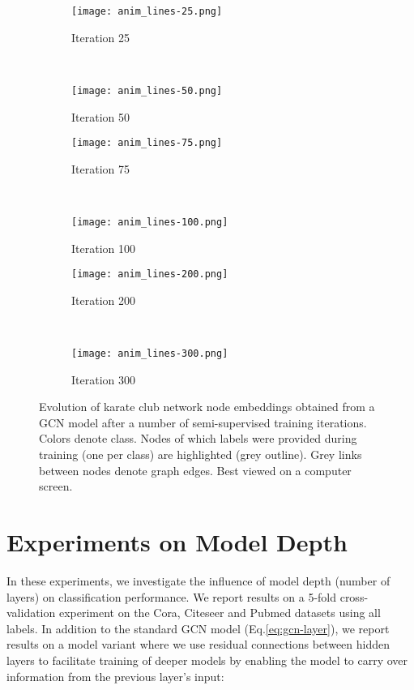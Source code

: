 \documentclass{article} \usepackage{iclr2017_conference,times}
\makeatletter
\newcommand*{\eq}{Eq.\@\xspace}
\makeatother
\begin{document}
\begin{figure}[htbp]
\centering
\begin{subfigure}[b]{0.5\textwidth}
    \centering
    \texttt{[image: anim\_lines-25.png]}
    \caption{Iteration 25}
    \label{fig:semi-emb-a}
\end{subfigure}~
\begin{subfigure}[b]{0.5\textwidth}
    \centering
    \texttt{[image: anim\_lines-50.png]}
    \caption{Iteration 50}
    \label{fig:semi-emb-b}
\end{subfigure}\vspace{0.5em}
\begin{subfigure}[b]{0.5\textwidth}
    \centering
    \texttt{[image: anim\_lines-75.png]}
    \caption{Iteration 75}
    \label{fig:semi-emb-c}
\end{subfigure}~
\begin{subfigure}[b]{0.5\textwidth}
    \centering
    \texttt{[image: anim\_lines-100.png]}
    \caption{Iteration 100}
    \label{fig:semi-emb-d}
\end{subfigure}\vspace{0.5em}
\begin{subfigure}[b]{0.5\textwidth}
    \centering
    \texttt{[image: anim\_lines-200.png]}
    \caption{Iteration 200}
    \label{fig:semi-emb-e}
\end{subfigure}~
\begin{subfigure}[b]{0.5\textwidth}
    \centering
    \texttt{[image: anim\_lines-300.png]}
    \caption{Iteration 300}
    \label{fig:semi-emb-f}
\end{subfigure}
\caption{Evolution of karate club network node embeddings obtained from a GCN model after a number of semi-supervised training iterations. Colors denote class. Nodes of which labels were provided during training (one per class) are highlighted (grey outline). Grey links between nodes denote graph edges. Best viewed on a computer screen.}
\label{fig:semi-emb}
\end{figure}

\newpage
\section{Experiments on Model Depth}
\label{sec:depth}
In these experiments, we investigate the influence of model depth (number of layers) on classification performance. We report results on a 5-fold cross-validation experiment on the Cora, Citeseer and Pubmed datasets \citep{sen2008collective} using all labels. In addition to the standard GCN model (\eq \ref{eq:gcn-layer}), we report results on a model variant where we use residual connections \citep{he2015deep} between hidden layers to facilitate training of deeper models by enabling the model to carry over information from the previous layer's input:
\end{document}
